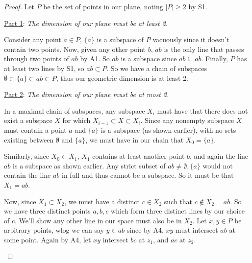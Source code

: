 \documentclass[12pt]{article}
\begin{document}
    \begin{proof}
        Let $P$ be the set of points in our plane, noting $|P|\geq 2$ by S1.

        \underline{Part 1}: \textit{The dimension of our plane must be at least 2.}

        Consider any point $a \in P$, $\{ a \}$ is a subspace of $P$ vacuously since it doesn't contain two points.
        Now, given any other point $b$, $ab$ is the only line that passes through two points of $ab$ by A1.
        So $ab$ is a subspace since $ab \subseteq ab$.
        Finally, $P$ has at least two lines by S1, so $ab \subset P$.
        So we have a chain of subspaces $\emptyset \subset \{a\} \subset ab \subset P$, thus our geometric dimension is at least 2.

        \underline{Part 2}: \textit{The dimension of our plane must be at most 2.}

        In a maximal chain of subspaces, any subspace $X_i$ must have that there does not exist a subspace $X$ for which $X_{i-1} \subset X \subset X_i$.
        Since any nonempty subspace $X$ must contain a point $a$ and $\{a\}$ is a subspace (as shown earlier),
        with no sets existing between $\emptyset$ and $\{a\}$, we must have in our chain that $X_0 = \{a\}$.

        Similarly, since $X_0 \subset X_1$, $X_1$ contains at least another point $b$, and again the line $ab$ is a subspace as shown earlier.
        Any strict subset of $ab \neq \emptyset, \{a\}$ would not contain the line $ab$ in full and thus cannot be a subspace.
        So it must be that $X_1 = ab$.

        Now, since $X_1 \subset X_2$, we must have a distinct $c \in X_2$ such that $c \notin X_2 = ab$.
        So we have three distinct points $a,b,c$ which form three distinct lines by our choice of $c$.
        We'll show any other line in our space must also be in $X_2$.
        Let $x,y \in P$ be arbitrary points, wlog we can say $y \in ab$ since by A4, $xy$ must intersect $ab$ at some point.
        Again by A4, let $xy$ intersect $bc$ at $z_1$, and $ac$ at $z_2$.

        \begin{figure}[h]
            \label{fig:triangle}
            \centering
\end{figure}
\end{proof}
\end{document}
